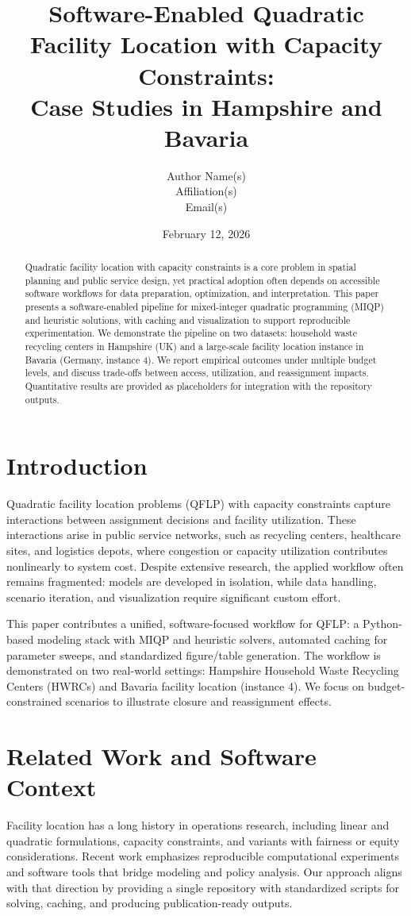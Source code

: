 \documentclass[11pt]{article}
\title{Software-Enabled Quadratic Facility Location with Capacity Constraints:\\
Case Studies in Hampshire and Bavaria}
\author{Author Name(s)\\
Affiliation(s)\\
Email(s)}
\date{February 12, 2026}
\begin{document}
\maketitle

\begin{abstract}
Quadratic facility location with capacity constraints is a core problem in spatial planning and public service design, yet practical adoption often depends on accessible software workflows for data preparation, optimization, and interpretation. This paper presents a software-enabled pipeline for mixed-integer quadratic programming (MIQP) and heuristic solutions, with caching and visualization to support reproducible experimentation. We demonstrate the pipeline on two datasets: household waste recycling centers in Hampshire (UK) and a large-scale facility location instance in Bavaria (Germany, instance 4). We report empirical outcomes under multiple budget levels, and discuss trade-offs between access, utilization, and reassignment impacts. Quantitative results are provided as placeholders for integration with the repository outputs.
\end{abstract}

\section{Introduction}
Quadratic facility location problems (QFLP) with capacity constraints capture interactions between assignment decisions and facility utilization. These interactions arise in public service networks, such as recycling centers, healthcare sites, and logistics depots, where congestion or capacity utilization contributes nonlinearly to system cost. Despite extensive research, the applied workflow often remains fragmented: models are developed in isolation, while data handling, scenario iteration, and visualization require significant custom effort.

This paper contributes a unified, software-focused workflow for QFLP: a Python-based modeling stack with MIQP and heuristic solvers, automated caching for parameter sweeps, and standardized figure/table generation. The workflow is demonstrated on two real-world settings: Hampshire Household Waste Recycling Centers (HWRCs) and Bavaria facility location (instance 4). We focus on budget-constrained scenarios to illustrate closure and reassignment effects.

\section{Related Work and Software Context}
Facility location has a long history in operations research, including linear and quadratic formulations, capacity constraints, and variants with fairness or equity considerations. Recent work emphasizes reproducible computational experiments and software tools that bridge modeling and policy analysis. Our approach aligns with that direction by providing a single repository with standardized scripts for solving, caching, and producing publication-ready outputs.
\end{document}
